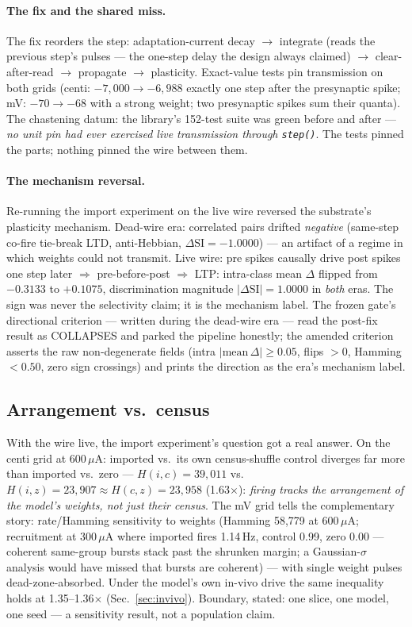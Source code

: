 \paragraph{The fix and the shared miss.}
The fix reorders the step: adaptation-current decay $\to$ integrate
(reads the previous step's pulses --- the one-step delay the design
always claimed) $\to$ clear-after-read $\to$ propagate $\to$
plasticity. Exact-value tests pin transmission on both grids
(centi: $-7{,}000 \to -6{,}988$ exactly one step after the presynaptic
spike; mV: $-70 \to -68$ with a strong weight; two presynaptic spikes
sum their quanta). The chastening datum: the library's 152-test suite
was green before and after --- \emph{no unit pin had ever exercised
live transmission through \texttt{step()}}. The tests pinned the
parts; nothing pinned the wire between them.

\paragraph{The mechanism reversal.}
Re-running the import experiment on the live wire reversed the
substrate's plasticity mechanism. Dead-wire era: correlated pairs
drifted \emph{negative} (same-step co-fire tie-break LTD,
anti-Hebbian, $\Delta\mathrm{SI} = -1.0000$) --- an artifact of a
regime in which weights could not transmit. Live wire: pre spikes
causally drive post spikes one step later $\Rightarrow$
pre-before-post $\Rightarrow$ LTP: intra-class mean $\Delta$
flipped from $-0.3133$ to $+0.1075$, discrimination magnitude
$|\Delta\mathrm{SI}| = 1.0000$ in \emph{both} eras. The sign was
never the selectivity claim; it is the mechanism label. The frozen
gate's directional criterion --- written during the dead-wire era ---
read the post-fix result as COLLAPSES and parked the pipeline
honestly; the amended criterion asserts the raw non-degenerate fields
(intra $|\mathrm{mean}\,\Delta| \ge 0.05$, flips $>0$, Hamming
$<0.50$, zero sign crossings) and prints the direction as the era's
mechanism label.

\subsection{Arrangement vs.\ census}
\label{sec:arrangement}

With the wire live, the import experiment's question got a real
answer. On the centi grid at 600\,$\mu$A: imported vs.\ its own
census-shuffle control diverges far more than imported vs.\ zero ---
$H(i,c) = 39{,}011$ vs.\ $H(i,z) = 23{,}907 \approx H(c,z) =
23{,}958$ (1.63$\times$): \emph{firing tracks the arrangement of the
model's weights, not just their census}. The mV grid tells the
complementary story: rate/Hamming sensitivity to weights (Hamming
58{,}779 at 600\,$\mu$A; recruitment at 300\,$\mu$A where imported
fires 1.14\,Hz, control 0.99, zero 0.00 --- coherent same-group
bursts stack past the shrunken margin; a Gaussian-$\sigma$ analysis
would have missed that bursts are coherent) --- with single weight
pulses dead-zone-absorbed. Under the model's own in-vivo drive the
same inequality holds at 1.35--1.36$\times$
(Sec.~\ref{sec:invivo}). Boundary, stated: one slice, one model, one
seed --- a sensitivity result, not a population claim.

